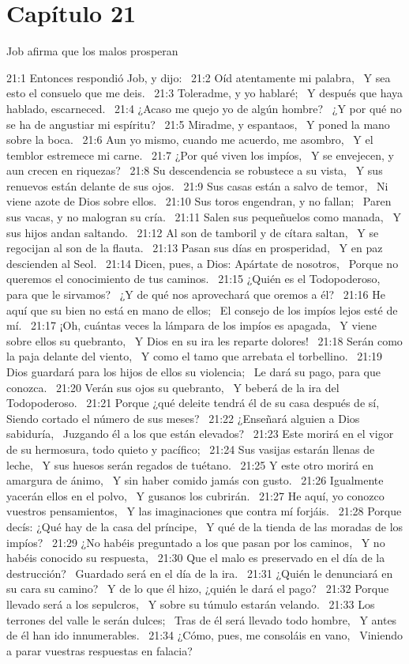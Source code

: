 \section*{Capítulo 21}
Job afirma que los malos prosperan  

21:1 Entonces respondió Job, y dijo:  
21:2 Oíd atentamente mi palabra,  
Y sea esto el consuelo que me deis.  
21:3 Toleradme, y yo hablaré;  
Y después que haya hablado, escarneced.  
21:4 ¿Acaso me quejo yo de algún hombre?  
¿Y por qué no se ha de angustiar mi espíritu?  
21:5 Miradme, y espantaos,  
Y poned la mano sobre la boca.  
21:6 Aun yo mismo, cuando me acuerdo, me asombro,  
Y el temblor estremece mi carne.  
21:7 ¿Por qué viven los impíos,  
Y se envejecen, y aun crecen en riquezas?  
21:8 Su descendencia se robustece a su vista,  
Y sus renuevos están delante de sus ojos.  
21:9 Sus casas están a salvo de temor,  
Ni viene azote de Dios sobre ellos.  
21:10 Sus toros engendran, y no fallan;  
Paren sus vacas, y no malogran su cría.  
21:11 Salen sus pequeñuelos como manada,  
Y sus hijos andan saltando.  
21:12 Al son de tamboril y de cítara saltan,  
Y se regocijan al son de la flauta.  
21:13 Pasan sus días en prosperidad,  
Y en paz descienden al Seol.  
21:14 Dicen, pues, a Dios: Apártate de nosotros,  
Porque no queremos el conocimiento de tus caminos.  
21:15 ¿Quién es el Todopoderoso, para que le sirvamos?  
¿Y de qué nos aprovechará que oremos a él?  
21:16 He aquí que su bien no está en mano de ellos;  
El consejo de los impíos lejos esté de mí.  
21:17 ¡Oh, cuántas veces la lámpara de los impíos es apagada,  
Y viene sobre ellos su quebranto,  
Y Dios en su ira les reparte dolores!  
21:18 Serán como la paja delante del viento,  
Y como el tamo que arrebata el torbellino.  
21:19 Dios guardará para los hijos de ellos su violencia;  
Le dará su pago, para que conozca.  
21:20 Verán sus ojos su quebranto,  
Y beberá de la ira del Todopoderoso.  
21:21 Porque ¿qué deleite tendrá él de su casa después de sí,  
Siendo cortado el número de sus meses?  
21:22 ¿Enseñará alguien a Dios sabiduría,  
Juzgando él a los que están elevados?  
21:23 Este morirá en el vigor de su hermosura, todo quieto y pacífico;  
21:24 Sus vasijas estarán llenas de leche,  
Y sus huesos serán regados de tuétano.  
21:25 Y este otro morirá en amargura de ánimo,  
Y sin haber comido jamás con gusto.  
21:26 Igualmente yacerán ellos en el polvo,  
Y gusanos los cubrirán.  
21:27 He aquí, yo conozco vuestros pensamientos,  
Y las imaginaciones que contra mí forjáis.  
21:28 Porque decís: ¿Qué hay de la casa del príncipe,  
Y qué de la tienda de las moradas de los impíos?  
21:29 ¿No habéis preguntado a los que pasan por los caminos,  
Y no habéis conocido su respuesta,  
21:30 Que el malo es preservado en el día de la destrucción?  
Guardado será en el día de la ira.  
21:31 ¿Quién le denunciará en su cara su camino?  
Y de lo que él hizo, ¿quién le dará el pago?  
21:32 Porque llevado será a los sepulcros,  
Y sobre su túmulo estarán velando.  
21:33 Los terrones del valle le serán dulces;  
Tras de él será llevado todo hombre,  
Y antes de él han ido innumerables.  
21:34 ¿Cómo, pues, me consoláis en vano,  
Viniendo a parar vuestras respuestas en falacia? 

